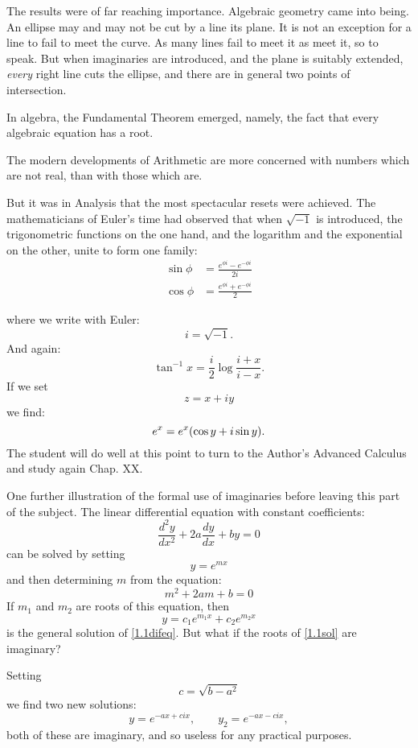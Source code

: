 \documentclass[letter,oneside]{memoir}
\begin{document}
The results were of far reaching importance. Algebraic geometry came into being. An ellipse may and may not be cut by a line its plane. It is not an exception for a line to fail to meet the curve. As many lines fail to meet it as meet it, so to speak. But when imaginaries are introduced, and the plane is suitably extended, \emph{every} right line cuts the ellipse, and there are in general two points of intersection. 

In algebra, the Fundamental Theorem emerged, namely, the fact that every algebraic equation has a root. 

The modern developments of Arithmetic are more concerned with numbers which are not real, than with those which are. 

But it was in Analysis that the most spectacular resets were achieved. The mathematicians of Euler's time had observed that when $\sqrt{-1} $ is introduced, the trigonometric functions on the one hand, and the logarithm and the exponential on the other, unite to form one family:
\begin{align}
	\sin \phi &=\frac{e^{\phi i}-e^{-\phi i}}{2i} \\
	\cos \phi &= \frac{e^{\phi i}+e^{-\phi i}}{2} 
\end{align} 

where we write with Euler:
\[
i=\sqrt{-1} 
.\] And again:
\[
\tan ^{-1}x=\frac{i}{2}\log \frac{i+x}{i-x} 
.\] If we set 
\[
z=x+iy 
\] we find:
\[
	e^{x}=e^x\pbr*{\cos y +i\sin y } 
.\] The student will do well at this point to turn to the Author's Advanced Calculus and study again Chap. XX.

One further illustration of the formal use of imaginaries before leaving this part of the subject. The linear differential equation with constant coefficients:
\begin{equation}\label{1.1difeq}
\frac{d^2y }{dx^2} +2a \frac{dy}{dx} +by =0
\end{equation} 
can be solved by setting 
\[
y=e^{mx}
\] and then determining $m$ from the equation:
\begin{equation}\label{1.1sol}
m^2+2am+b=0
\end{equation} If $m_1$ and $m_2$ are roots of this equation, then 
\[
y =c_1e^{m_1x}+c_2e^{m_2x}
\] is the general solution of \ref{1.1difeq}. But what if the roots of \ref{1.1sol} are imaginary? 

Setting 
\begin{equation}\label{1.1c}
c=\sqrt{b-a^2} 
\end{equation} we find two new solutions:
\[
y=e^{-ax+cix}, \qquad y_2=e^{-ax-cix}
,\] both of these are imaginary, and so useless for any practical purposes. 
\end{document}
